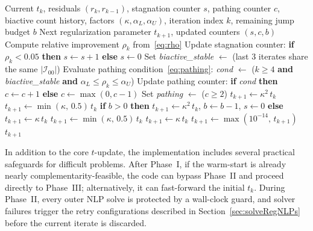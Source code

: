 \begin{algorithm}[H]
\caption{Phase~II Adaptive $t$-Update}
\label{alg:phase2-update}
\begin{algorithmic}[1]
\Require Current $t_k$, residuals $(r_k,r_{k-1})$, stagnation counter $s$, pathing counter $c$, biactive count history, factors $(\kappa,\alpha_L,\alpha_U)$, iteration index $k$, remaining jump budget $b$
\Ensure Next regularization parameter $t_{k+1}$, updated counters $(s,c,b)$
\State Compute relative improvement $\rho_k$ from~\eqref{eq:rho}
\State Update stagnation counter: \textbf{if} $\rho_k < 0.05$ \textbf{then} $s \gets s+1$ \textbf{else} $s \gets 0$
\State Set \textit{biactive\_stable} $\gets$ (last 3 iterates share the same $|\mathcal{I}_{00}|$)
\State Evaluate pathing condition~\eqref{eq:pathing}: \textit{cond} $\gets$ ($k \ge 4$ \textbf{and} \textit{biactive\_stable} \textbf{and} $\alpha_L \le \rho_k \le \alpha_U$)
\State Update pathing counter: \textbf{if} \textit{cond} \textbf{then} $c \gets c+1$ \textbf{else} $c \gets \max(0,c-1)$
\State Set \textit{pathing} $\gets$ ($c \ge 2$)
  \State {}
  \State $t_{k+1} \gets \kappa^2\, t_k$
  \State {}
  \State $t_{k+1} \gets \min(\kappa,\,0.5)\,t_k$
  \State {}
  \State \textbf{if} $b>0$ \textbf{then} $t_{k+1} \gets \kappa^2\, t_k$, $b \gets b-1$, $s \gets 0$ \textbf{else} $t_{k+1} \gets \kappa\, t_k$
  \State {}
  \State $t_{k+1} \gets \min(\kappa,\,0.5)\,t_k$
\Else
  \State {}
  \State $t_{k+1} \gets \kappa\, t_k$
\EndIf
  \State $t_{k+1} \gets \max(10^{-14},\, t_{k+1})$
\State \Return $t_{k+1}$
\end{algorithmic}
\end{algorithm}

In addition to the core $t$-update, the implementation includes several
practical safeguards for difficult problems. After Phase~I, if the
warm-start is already nearly complementarity-feasible, the code can
bypass Phase~II and proceed directly to Phase~III; alternatively, it can
fast-forward the initial $t_k$. During Phase~II, every outer NLP
solve is protected by a wall-clock guard, and solver failures trigger
the retry configurations described in
Section~\ref{sec:solveRegNLPs} before the current iterate is discarded.

